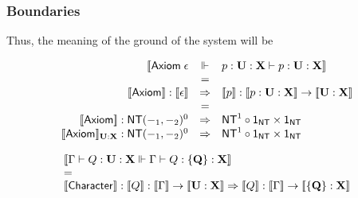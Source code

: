 \subsubsection{Boundaries}


Thus, the meaning of the ground of the system will be

$$\begin{array}{rcl}
  \ldb \mathsf{Axiom}\; \epsilon & \Vdash & p : \mathbf{U} : \mathbf {X} \vdash p : \mathbf{U} : \mathbf {X} \rdb \\
  & = & \\
  \meaningof{\mathsf{Axiom}} : \meaningof{\epsilon} & \Rightarrow & \meaningof{p} : \meaningof{p : \mathbf{U : X}} \to \meaningof{\mathbf{U : X}} \\
 & = & \\
  \meaningof{\mathsf{Axiom}} : \mathsf{NT}( -_{1}, -_{2} )^{0} & \Rightarrow & \mathsf{NT}^{1} \circ \mathsf{1}_{\mathsf{NT}} \times \mathsf{1}_{\mathsf{NT}} \\
  \meaningof{\mathsf{Axiom}}_{\mathbf{U} : \mathbf{X}} : \mathsf{NT}( -_{1}, -_{2} )^{0} & \Rightarrow & \mathsf{NT}^{1} \circ \mathsf{1}_{\mathsf{NT}} \times \mathsf{1}_{\mathsf{NT}} \\
\end{array}$$

$$\begin{array}{l}
  \meaningof{\Gamma \vdash Q : \mathbf{U} : \mathbf {X} \Vdash \Gamma \vdash Q : \mathbf{\{ Q \}} : \mathbf {X}} \\
  = \\
  \meaningof{\mathsf{Character}} : \meaningof{Q} : \meaningof{\Gamma} \to \meaningof{\mathbf{U} : \mathbf{X}} \Rightarrow \meaningof{Q} : \meaningof{\Gamma} \to \meaningof{\mathbf{\{ Q \}} : \mathbf {X}}
\end{array}$$


